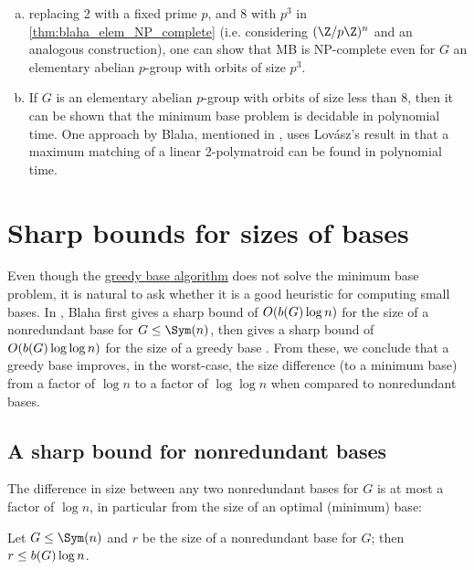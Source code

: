 \begin{remark}\label{rem:blaha_elem_greedy}
    \begin{enumerate}[(a)]
        \item {} replacing 2 with a fixed prime $p$, and 8 with $p^3$ in \autoref{thm:blaha_elem_NP_complete} (i.e. considering $(\Z/p\Z)^n$ and an analogous construction), one can show that MB is NP-complete even for $G$ an elementary abelian $p$-group with orbits of size $p^3$.
        \item If $G$ is an elementary abelian $p$-group with orbits of size less than 8, then it can be shown that the minimum base problem is decidable in polynomial time. One approach by Blaha, mentioned in \cite{blaha1992}, uses Lov\'asz's result in \cite{lovasz1980} that a maximum matching of a linear 2-polymatroid can be found in polynomial time.
    \end{enumerate}
\end{remark}

\section{Sharp bounds for sizes of bases}

Even though the \hyperref[alg:blaha_greedy_base]{greedy base algorithm} does not solve the minimum base problem, it is natural to ask whether it is a good heuristic for computing small bases. In \cite{blaha1992}, Blaha first gives a sharp bound of $O(\added{2}{b(G)}\log n)$ for the size of a nonredundant base for $G \leq \Sym(n)$, then gives a sharp bound of $O(\added{2}{b(G)}\log\log n)$ for the size of a greedy base . From these, we conclude that a greedy base improves, in the worst-case, the size difference (to a minimum base) from a factor of $\log n$ to a factor of $\log\log n$ when compared to nonredundant bases.

\subsection{A sharp bound for nonredundant bases}

The difference in size between any two nonredundant bases for $G$ is at most a factor of $\log n$, in particular from the size of an optimal (minimum) base:

\begin{lemma}\label{lem:blaha_nonredundant_size}
    Let $G \leq \Sym(n)$ and $r$ be the size of a nonredundant base for $G$; then $r \leq \added{2}{b(G)}\log n$.
\end{lemma}

